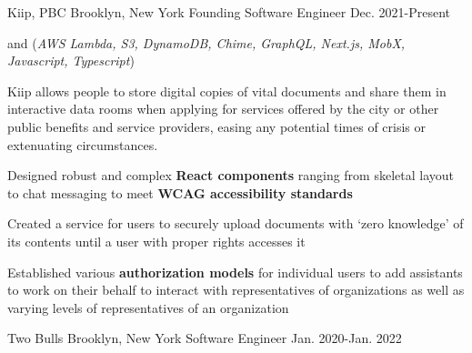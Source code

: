 

\begin{cventries}


  \nrolecventrynoitems
    {Kiip, PBC} %
    {Brooklyn, New York} %
    {Founding Software Engineer} %
    {Dec. 2021-Present} %
    {} %
    {} %
    {} %
    {} %

  \cvcustombodydescription
    { and  (\emph{AWS Lambda, S3, DynamoDB, Chime, GraphQL, Next.js, MobX, Javascript, Typescript})}
    {
      \begin{cvtightprose} %
        {Kiip allows people to store digital copies of vital documents and share them in interactive data rooms when applying for services offered by the city or other public benefits and service providers, easing any potential times of crisis or extenuating circumstances.}
      \end{cvtightprose}
    }
    {
      \begin{cvitems} %
        \item {Designed robust and complex \textbf{React components} ranging from skeletal layout to chat messaging to meet \textbf{WCAG accessibility standards}}
        \item {Created a service for users to securely upload documents with `zero knowledge' of its contents until a user with proper rights accesses it}
        \item {Established various \textbf{authorization models} for individual users to add assistants to work on their behalf to interact with representatives of organizations as well as varying levels of representatives of an organization}
      \end{cvitems}
    }

  \nrolecventrynoitems
    {Two Bulls} %
    {Brooklyn, New York} %
    {Software Engineer} %
    {Jan. 2020-Jan. 2022} %
    {} %
    {} %
    {} %
    {} %


\end{cventries}
